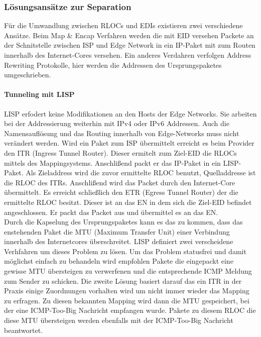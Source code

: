 \subsubsection{Lösungsansätze zur Separation}
Für die Umwandlung zwischen RLOCs und EDIs existieren zwei verschiedene Ansätze. Beim Map \& Encap Verfahren werden die mit EID versehen Packete an der Schnitstelle zwischen ISP und Edge Network in ein IP-Paket mit zum Routen innerhalb des Internet-Cores versehen. Ein anderes Verdahren verfolgen Address Rewriting Protokolle, hier werden die Addressen des Ursprungspaketes umgeschrieben. 

\paragraph{Tunneling mit LISP}
LISP erfodert keine Modifikationen an den Hosts der Edge Networks. Sie arbeiten bei der Addressierung weiterhin mit IPv4 oder IPv6 Addressen. Auch die Namensauflösung und das Routing innerhalb von Edge-Networks muss nicht verändert werden. Wird ein Paket zum ISP übermittelt erreicht es beim Provider den ITR (Ingress Tunnel Router). Dieser ermitelt zum Ziel-EID die RLOCs mittels des Mappingsystems. Anschlißend packt er das IP-Paket in ein LISP-Paket. Als Zieladdress wird die zuvor ermittelte RLOC benutzt, Quelladdresse ist die RLOC des ITRs. Anschlißend wird das Packet durch den Internet-Core übermittelt. Es erreicht schließlich den ETR (Egress Tunnel Router) der die ermittelte RLOC besitzt. Dieser ist an das EN in dem sich die Ziel-EID befindet angeschlossen. Er packt das Packet aus und übermittel es an das EN. \\
Durch die Kapselung des Ursprungspaketes kann es das zu kommen, dass das enstehenden Paket die MTU (Maximum Transfer Unit) einer Verbindung innerhalb des Internetcores überschreitet. LISP definiert zwei verscheidene Verhfahren um dieses Problem zu lösen. Um das Problem statusfrei und damit möglichst einfach zu behandeln wird empfohlen Pakete die eingepackt eine gewisse MTU übersteigen zu verwerfenen und die entsprechende ICMP Meldung zum Sender zu schicken. Die zweite Lösung basiert darauf das ein ITR in der Praxis einige Zuordnungen vorhalten wird um nicht immer wieder das Mapping zu erfragen. Zu diesen bekannten Mapping wird dann die MTU gespeichert, bei der eine ICMP-Too-Big Nachricht empfangen wurde. Pakete zu diesem RLOC die diese MTU übersteigen werden ebenfalls mit der ICMP-Too-Big Nachricht beantwortet.

